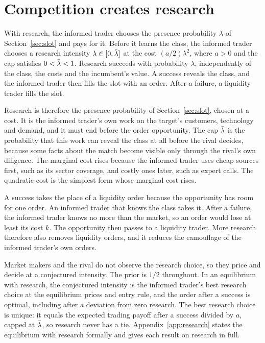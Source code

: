 \section{Competition creates research}\label{sec:research}

With research, the informed trader chooses the presence probability \(\lambda\) of Section~\ref{sec:slot} and pays for it.
Before it learns the class, the informed trader chooses a research intensity \(\lambda\in[0,\bar\lambda]\) at the
cost \((a/2)\lambda^2\), where \(a>0\) and the cap satisfies \(0<\bar\lambda<1\). Research succeeds with probability
\(\lambda\), independently of the class, the costs and the incumbent's value. A success reveals the class, and the
informed trader then fills the slot with an order. After a failure, a liquidity trader fills the slot.

Research is therefore the presence probability of Section~\ref{sec:slot}, chosen at a cost. It is the informed trader's own work on the target's customers, technology and demand, and it must end before the order opportunity. The cap
\(\bar\lambda\) is the probability that this work can reveal the class at all before the rival decides, because some
facts about the match become visible only through the rival's own diligence. The marginal cost rises because the informed trader uses cheap sources first, such as its sector coverage, and costly ones later, such as expert calls. The
quadratic cost is the simplest form whose marginal cost rises.

A success takes the place of a liquidity order because the opportunity has room for one order. An informed trader that
knows the class takes it. After a failure, the informed trader knows no more than the market, so an order would lose at
least its cost \(k\). The opportunity then passes to a liquidity trader. More research therefore also removes
liquidity orders, and it reduces the camouflage of the informed trader's own orders.

Market makers and the rival do not observe the research choice, so they price and decide at a conjectured
intensity. The prior is \(1/2\) throughout. In an equilibrium with research, the conjectured
intensity is the informed trader's best research choice at the equilibrium prices and entry rule, and the order after
a success is optimal, including after a deviation from zero research.
The best research choice is unique: it equals the expected trading payoff after a success divided by \(a\), capped
at \(\bar\lambda\), so research never has a tie. Appendix~\ref{app:research} states the equilibrium with research
formally and gives each result on research in full.

